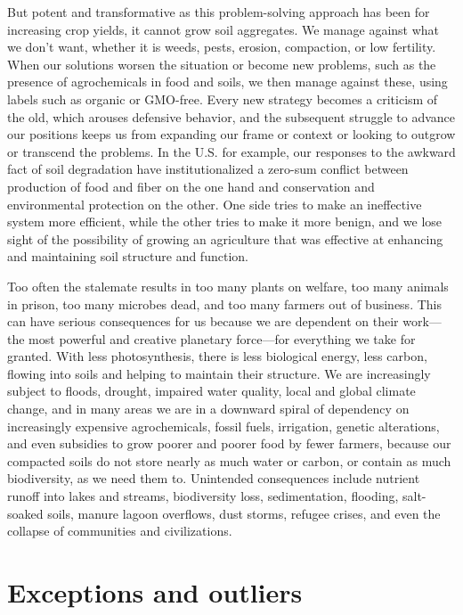 \documentclass[11pt,letterpaper,twoside,onecolumn]{memoir}
\begin{document}
But potent and transformative as this problem-solving approach has been for increasing crop yields, it cannot grow soil aggregates. We manage against what we don't want, whether it is weeds, pests, erosion, compaction, or low fertility. When our solutions worsen the situation or become new problems, such as the presence of agrochemicals in food and soils, we then manage against these, using labels such as organic or GMO-free. Every new strategy becomes a criticism of the old, which arouses defensive behavior, and the subsequent struggle to advance our positions keeps us from expanding our frame or context or looking to outgrow or transcend the problems. In the U.S. for example, our responses to the awkward fact of soil degradation have institutionalized a zero-sum conflict between production of food and fiber on the one hand and conservation and environmental protection on the other. One side tries to make an ineffective system more efficient, while the other tries to make it more benign, and we lose sight of the possibility of growing an agriculture that was effective at enhancing and maintaining soil structure and function.

Too often the stalemate results in too many plants on welfare, too many animals in prison, too many microbes dead, and too many farmers out of business. This can have serious consequences for us because we are dependent on their work---the most powerful and creative planetary force---for everything we take for granted. With less photosynthesis, there is less biological energy, less carbon, flowing into soils and helping to maintain their structure. We are increasingly subject to floods, drought, impaired water quality, local and global climate change, and in many areas we are in a downward spiral of dependency on increasingly expensive agrochemicals, fossil fuels, irrigation, genetic alterations, and even subsidies to grow poorer and poorer food by fewer farmers, because our compacted soils do not store nearly as much water or carbon, or contain as much biodiversity, as we need them to. Unintended consequences include nutrient runoff into lakes and streams, biodiversity loss, sedimentation, flooding, salt-soaked soils, manure lagoon overflows, dust storms, refugee crises, and even the collapse of communities and civilizations. 

\section*{Exceptions and outliers}
\end{document}
